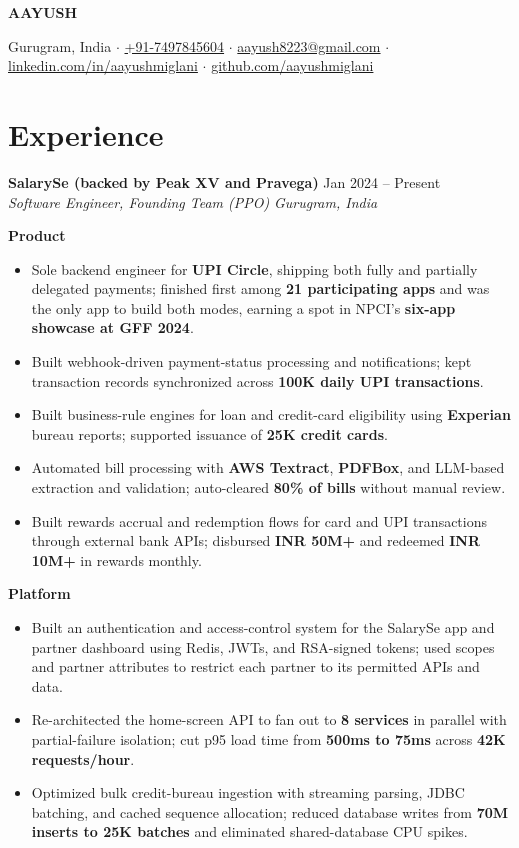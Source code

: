 \documentclass[10pt]{article}
\newcommand{\name}[1]{\begin{center}{\fontsize{22}{24}\selectfont\bfseries #1}\end{center}\vspace{-2pt}}
\newcommand{\contact}[1]{\begin{center}{\small #1}\end{center}\vspace{-4pt}}
\newcommand{\entry}[4]{\textbf{#1} \hfill #3 \\ \textit{#2} \hfill \textit{#4}\vspace{1pt}}
\newcommand{\proj}[2]{\vspace{2pt}\textbf{#1}\hfill #2\par\vspace{-2pt}}
\newenvironment{bullets}{\begin{itemize}[leftmargin=12pt,itemsep=1.5pt,topsep=1pt,parsep=0pt]}{\end{itemize}}
\begin{document}
\pagestyle{empty}
\fontsize{10}{11.2}\selectfont

\name{AAYUSH}
\contact{Gurugram, India $\cdot$ \href{tel:+917497845604}{+91-7497845604} $\cdot$ \href{mailto:aayush8223@gmail.com}{aayush8223@gmail.com} $\cdot$ \href{https://www.linkedin.com/in/aayushmiglani/}{linkedin.com/in/aayushmiglani} $\cdot$ \href{https://github.com/aayushmiglani}{github.com/aayushmiglani}}

\section{Experience}
\entry{SalarySe (backed by Peak XV and Pravega)}{Software Engineer, Founding Team (PPO)}{Jan 2024 -- Present}{Gurugram, India}

\proj{Product}{}
\begin{bullets}
  \item Sole backend engineer for \textbf{UPI Circle}, shipping both fully and partially delegated payments; finished first among \textbf{21 participating apps} and was the only app to build both modes, earning a spot in NPCI's \textbf{six-app showcase at GFF 2024}.
  \item Built webhook-driven payment-status processing and notifications; kept transaction records synchronized across \textbf{100K daily UPI transactions}.
  \item Built business-rule engines for loan and credit-card eligibility using \textbf{Experian} bureau reports; supported issuance of \textbf{25K credit cards}.
  \item Automated bill processing with \textbf{AWS Textract}, \textbf{PDFBox}, and LLM-based extraction and validation; auto-cleared \textbf{80\% of bills} without manual review.
  \item Built rewards accrual and redemption flows for card and UPI transactions through external bank APIs; disbursed \textbf{INR 50M+} and redeemed \textbf{INR 10M+} in rewards monthly.
\end{bullets}

\proj{Platform}{}
\begin{bullets}
  \item Built an authentication and access-control system for the SalarySe app and partner dashboard using Redis, JWTs, and RSA-signed tokens; used scopes and partner attributes to restrict each partner to its permitted APIs and data.
  \item Re-architected the home-screen API to fan out to \textbf{8 services} in parallel with partial-failure isolation; cut p95 load time from \textbf{500ms to 75ms} across \textbf{42K requests/hour}.
  \item Optimized bulk credit-bureau ingestion with streaming parsing, JDBC batching, and cached sequence allocation; reduced database writes from \textbf{70M inserts to 25K batches} and eliminated shared-database CPU spikes.
\end{bullets}
\end{document}
